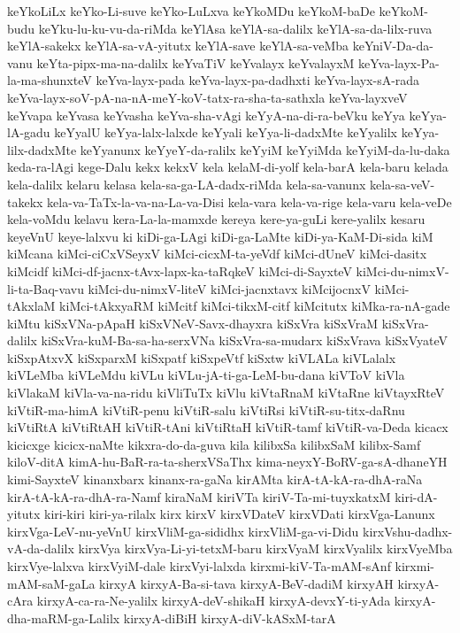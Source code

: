 {keYkoLiLx
keYko-Li-suve
keYko-LuLxva
keYkoMDu
keYkoM-baDe
keYkoM-budu
keYku-lu-ku-vu-da-riMda
keYlAsa
keYlA-sa-dalilx
keYlA-sa-da-lilx-ruva
keYlA-sakekx
keYlA-sa-vA-yitutx
keYlA-save
keYlA-sa-veMba
keYniV-Da-da-vanu
keYta-pipx-ma-na-dalilx
keYvaTiV
keYvalayx
keYvalayxM
keYva-layx-Pa-la-ma-shunxteV
keYva-layx-pada
keYva-layx-pa-dadhxti
keYva-layx-sA-rada
keYva-layx-soV-pA-na-nA-meY-koV-tatx-ra-sha-ta-sathxla
keYva-layxveV
keYvapa
keYvasa
keYvasha
keYva-sha-vAgi
keYyA-na-di-ra-beVku
keYya
keYya-lA-gadu
keYyalU
keYya-lalx-lalxde
keYyali
keYya-li-dadxMte
keYyalilx
keYya-lilx-dadxMte
keYyanunx
keYyeY-da-ralilx
keYyiM
keYyiMda
keYyiM-da-lu-daka
keda-ra-lAgi
kege-Dalu
kekx
kekxV
kela
kelaM-di-yolf
kela-barA
kela-baru
kelada
kela-dalilx
kelaru
kelasa
kela-sa-ga-LA-dadx-riMda
kela-sa-vanunx
kela-sa-veV-takekx
kela-va-TaTx-la-va-na-La-va-Disi
kela-vara
kela-va-rige
kela-varu
kela-veDe
kela-voMdu
kelavu
kera-La-la-mamxde
kereya
kere-ya-guLi
kere-yalilx
kesaru
keyeVnU
keye-lalxvu
ki
kiDi-ga-LAgi
kiDi-ga-LaMte
kiDi-ya-KaM-Di-sida
kiM
kiMcana
kiMci-ciCxVSeyxV
kiMci-cicxM-ta-yeVdf
kiMci-dUneV
kiMci-dasitx
kiMcidf
kiMci-df-jacnx-tAvx-lapx-ka-taRqkeV
kiMci-di-SayxteV
kiMci-du-nimxV-li-ta-Baq-vavu
kiMci-du-nimxV-liteV
kiMci-jacnxtavx
kiMcijocnxV
kiMci-tAkxlaM
kiMci-tAkxyaRM
kiMcitf
kiMci-tikxM-citf
kiMcitutx
kiMka-ra-nA-gade
kiMtu
kiSxVNa-pApaH
kiSxVNeV-Savx-dhayxra
kiSxVra
kiSxVraM
kiSxVra-dalilx
kiSxVra-kuM-Ba-sa-ha-serxVNa
kiSxVra-sa-mudarx
kiSxVrava
kiSxVyateV
kiSxpAtxvX
kiSxparxM
kiSxpatf
kiSxpeVtf
kiSxtw
kiVLALa
kiVLalalx
kiVLeMba
kiVLeMdu
kiVLu
kiVLu-jA-ti-ga-LeM-bu-dana
kiVToV
kiVla
kiVlakaM
kiVla-va-na-ridu
kiVliTuTx
kiVlu
kiVtaRnaM
kiVtaRne
kiVtayxRteV
kiVtiR-ma-himA
kiVtiR-penu
kiVtiR-salu
kiVtiRsi
kiVtiR-su-titx-daRnu
kiVtiRtA
kiVtiRtAH
kiVtiR-tAni
kiVtiRtaH
kiVtiR-tamf
kiVtiR-va-Deda
kicacx
kicicxge
kicicx-naMte
kikxra-do-da-guva
kila
kilibxSa
kilibxSaM
kilibx-Samf
kiloV-ditA
kimA-hu-BaR-ra-ta-sherxVSaThx
kima-neyxY-BoRV-ga-sA-dhaneYH
kimi-SayxteV
kinanxbarx
kinanx-ra-gaNa
kirAMta
kirA-tA-kA-ra-dhA-raNa
kirA-tA-kA-ra-dhA-ra-Namf
kiraNaM
kiriVTa
kiriV-Ta-mi-tuyxkatxM
kiri-dA-yitutx
kiri-kiri
kiri-ya-rilalx
kirx
kirxV
kirxVDateV
kirxVDati
kirxVga-Lanunx
kirxVga-LeV-nu-yeVnU
kirxVliM-ga-sididhx
kirxVliM-ga-vi-Didu
kirxVshu-dadhx-vA-da-dalilx
kirxVya
kirxVya-Li-yi-tetxM-baru
kirxVyaM
kirxVyalilx
kirxVyeMba
kirxVye-lalxva
kirxVyiM-dale
kirxVyi-lalxda
kirxmi-kiV-Ta-mAM-sAnf
kirxmi-mAM-saM-gaLa
kirxyA
kirxyA-Ba-si-tava
kirxyA-BeV-dadiM
kirxyAH
kirxyA-cAra
kirxyA-ca-ra-Ne-yalilx
kirxyA-deV-shikaH
kirxyA-devxY-ti-yAda
kirxyA-dha-maRM-ga-Lalilx
kirxyA-diBiH
kirxyA-diV-kASxM-tarA
}
